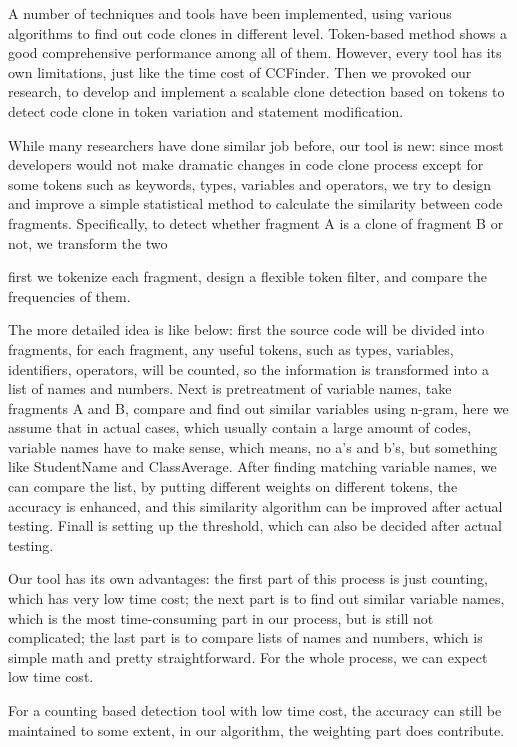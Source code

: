 \documentclass[conference]{IEEEtran}
\begin{document}
A number of techniques and tools have been implemented, using various algorithms to find out code clones in different level. Token-based method shows a good comprehensive performance among all of them. However, every tool has its own limitations, just like the time cost of CCFinder. Then we provoked our research, to develop and implement a scalable clone detection based on tokens to detect code clone in token variation and statement modification.

While many researchers have done similar job before, our tool is new: since most developers would not make dramatic changes in code clone process except for some tokens such as keywords, types, variables and operators, we try to design and improve a simple statistical method to calculate the similarity between code fragments. Specifically, to detect whether fragment A is a clone of fragment B or not, we transform the two 


first we tokenize each fragment, design a flexible token filter, and compare the frequencies of them.




The more detailed idea is like below:
first the source code will be divided into fragments, for each fragment, any useful tokens, such as types, variables, identifiers, operators, will be counted, so the information is transformed into a list of names and numbers. 
Next is pretreatment of variable names, take fragments A and B, compare and find out similar variables using n-gram, here we assume that in actual cases, which usually contain a large amount of codes, variable names have to make sense, which means, no a's and b's, but something like StudentName and ClassAverage.
After finding matching variable names, we can compare the list, by putting different weights on different tokens, the accuracy is enhanced, and this similarity algorithm can be improved after actual testing.
Finall is setting up the threshold, which can also be decided after actual testing.

Our tool has its own advantages: the first part of this process is just counting, which has very low time cost; the next part is to find out similar variable names, which is the most time-consuming part in our process, but is still not complicated; the last part is to compare lists of names and numbers, which is simple math and pretty straightforward. For the whole process, we can expect low time cost.

For a counting based detection tool with low time cost, the accuracy can still be maintained to some extent, in our algorithm, the weighting part does contribute.
\end{document}
